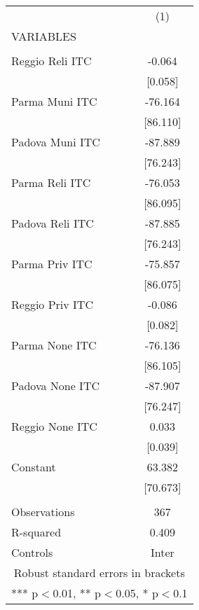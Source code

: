 \begin{tabular}{lc} \hline
 & (1) \\
VARIABLES &  \\ \hline
 &  \\
Reggio Reli ITC & -0.064 \\
 & [0.058] \\
Parma Muni ITC & -76.164 \\
 & [86.110] \\
Padova Muni ITC & -87.889 \\
 & [76.243] \\
Parma Reli ITC & -76.053 \\
 & [86.095] \\
Padova Reli ITC & -87.885 \\
 & [76.243] \\
Parma Priv ITC & -75.857 \\
 & [86.075] \\
Reggio Priv ITC & -0.086 \\
 & [0.082] \\
Parma None ITC & -76.136 \\
 & [86.105] \\
Padova None ITC & -87.907 \\
 & [76.247] \\
Reggio None ITC & 0.033 \\
 & [0.039] \\
Constant & 63.382 \\
 & [70.673] \\
 &  \\
Observations & 367 \\
R-squared & 0.409 \\
 Controls & Inter \\ \hline
\multicolumn{2}{c}{ Robust standard errors in brackets} \\
\multicolumn{2}{c}{ *** p$<$0.01, ** p$<$0.05, * p$<$0.1} \\
\end{tabular}
